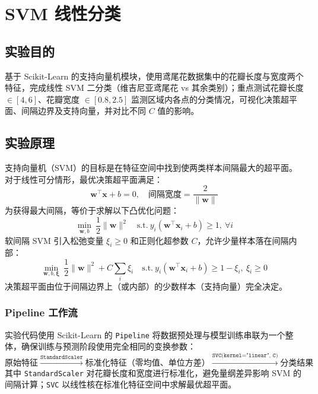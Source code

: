 \documentclass[10.5pt]{config}
\date{\today}
\begin{document}
\makeheader %

\section{SVM 线性分类}

\subsection{实验目的}
基于 Scikit-Learn 的支持向量机模块，使用鸢尾花数据集中的花瓣长度与宽度两个特征，完成线性 SVM 二分类（维吉尼亚鸢尾花 vs 其余类别）；重点测试花瓣长度 $\in[4,6]$、花瓣宽度 $\in[0.8,2.5]$ 监测区域内各点的分类情况，可视化决策超平面、间隔边界及支持向量，并对比不同 $C$ 值的影响。

\subsection{实验原理}
支持向量机（SVM）的目标是在特征空间中找到使两类样本间隔最大的超平面。对于线性可分情形，最优决策超平面满足：
$$\mathbf{w}^{\top}\mathbf{x} + b = 0, \quad \text{间隔宽度} = \frac{2}{\|\mathbf{w}\|}$$
为获得最大间隔，等价于求解以下凸优化问题：
$$\min_{\mathbf{w},b}\ \frac{1}{2}\|\mathbf{w}\|^2 \quad \text{s.t.}\ y_i(\mathbf{w}^{\top}\mathbf{x}_i+b)\geq 1,\ \forall i$$
软间隔 SVM 引入松弛变量 $\xi_i \geq 0$ 和正则化超参数 $C$，允许少量样本落在间隔内部：
$$\min_{\mathbf{w},b,\boldsymbol{\xi}}\ \frac{1}{2}\|\mathbf{w}\|^2 + C\sum_i\xi_i \quad \text{s.t.}\ y_i(\mathbf{w}^{\top}\mathbf{x}_i+b)\geq 1-\xi_i,\ \xi_i\geq 0$$
决策超平面由位于间隔边界上（或内部）的少数样本（支持向量）完全决定。

\subsubsection{Pipeline 工作流}
实验代码使用 Scikit-Learn 的 \texttt{Pipeline} 将数据预处理与模型训练串联为一个整体，确保训练与预测阶段使用完全相同的变换参数：
$$\text{原始特征} \xrightarrow{\texttt{StandardScaler}} \text{标准化特征（零均值、单位方差）} \xrightarrow{\texttt{SVC(kernel="linear", C)}} \text{分类结果}$$
其中 \texttt{StandardScaler} 对花瓣长度和宽度进行标准化，避免量纲差异影响 SVM 的间隔计算；\texttt{SVC} 以线性核在标准化特征空间中求解最优超平面。
\end{document}
